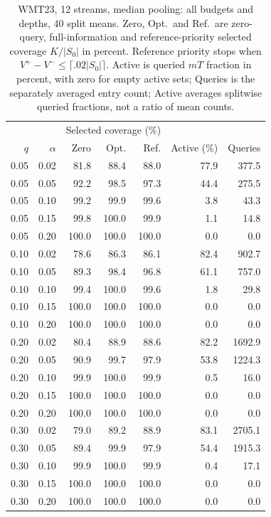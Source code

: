 \begin{table}[t]
\centering\small
\begin{tabular}{rrrrrrr}
\toprule
 & & \multicolumn{3}{c}{Selected coverage (\%)} & & \\
$q$ & $\alpha$ & Zero & Opt. & Ref. & Active (\%) & Queries \\
\midrule
0.05 & 0.02 & 81.8 & 88.4 & 88.0 & 77.9 & 377.5 \\
0.05 & 0.05 & 92.2 & 98.5 & 97.3 & 44.4 & 275.5 \\
0.05 & 0.10 & 99.2 & 99.9 & 99.6 & 3.8 & 43.3 \\
0.05 & 0.15 & 99.8 & 100.0 & 99.9 & 1.1 & 14.8 \\
0.05 & 0.20 & 100.0 & 100.0 & 100.0 & 0.0 & 0.0 \\
0.10 & 0.02 & 78.6 & 86.3 & 86.1 & 82.4 & 902.7 \\
0.10 & 0.05 & 89.3 & 98.4 & 96.8 & 61.1 & 757.0 \\
0.10 & 0.10 & 99.4 & 100.0 & 99.6 & 1.8 & 29.8 \\
0.10 & 0.15 & 100.0 & 100.0 & 100.0 & 0.0 & 0.0 \\
0.10 & 0.20 & 100.0 & 100.0 & 100.0 & 0.0 & 0.0 \\
0.20 & 0.02 & 80.4 & 88.9 & 88.6 & 82.2 & 1692.9 \\
0.20 & 0.05 & 90.9 & 99.7 & 97.9 & 53.8 & 1224.3 \\
0.20 & 0.10 & 99.9 & 100.0 & 99.9 & 0.5 & 16.0 \\
0.20 & 0.15 & 100.0 & 100.0 & 100.0 & 0.0 & 0.0 \\
0.20 & 0.20 & 100.0 & 100.0 & 100.0 & 0.0 & 0.0 \\
0.30 & 0.02 & 79.0 & 89.2 & 88.9 & 83.1 & 2705.1 \\
0.30 & 0.05 & 89.4 & 99.9 & 97.9 & 54.4 & 1915.3 \\
0.30 & 0.10 & 99.9 & 100.0 & 99.9 & 0.4 & 17.1 \\
0.30 & 0.15 & 100.0 & 100.0 & 100.0 & 0.0 & 0.0 \\
0.30 & 0.20 & 100.0 & 100.0 & 100.0 & 0.0 & 0.0 \\
\bottomrule
\end{tabular}
\caption{WMT23, 12 streams, median pooling: all budgets and depths, 40 split means. Zero, Opt.\ and Ref.\ are zero-query, full-information and reference-priority selected coverage $K/|S_0|$ in percent. Reference priority stops when $V^+-V^-\le\lceil.02|S_0|\rceil$. Active is queried $mT$ fraction in percent, with zero for empty active sets; Queries is the separately averaged entry count; Active averages splitwise queried fractions, not a ratio of mean counts.}
\label{tab:review-budget-2-median}
\end{table}
